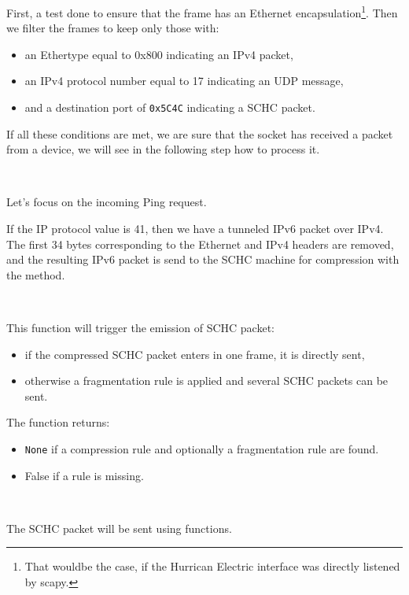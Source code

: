 
First, a test done to ensure that the frame has an Ethernet encapsulation\footnote{That wouldbe the case, if the Hurrican Electric interface was directly listened by scapy.}. Then we filter the frames to keep only those with:
\begin{itemize}
    \item an Ethertype equal to 0x800 indicating an IPv4 packet,
    \item an IPv4 protocol number equal to 17 indicating an UDP message,
    \item and a destination port of \texttt{0x5C4C} indicating a SCHC packet.
\end{itemize}

If all these conditions are met, we are sure that the socket has received a packet from a device, we will see in the following step how to process it.

~

Let's focus on the incoming Ping request.




If the IP protocol value is 41, then we have a tunneled IPv6 packet over IPv4. The first 34 bytes corresponding to the Ethernet and IPv4 headers are removed, and the resulting IPv6 packet is send to the SCHC machine for compression with the  method. 

~~

This function will trigger the emission of SCHC packet: 
\begin{itemize}
    \item if the compressed SCHC packet enters in one frame, it is directly sent,
    \item otherwise a fragmentation rule is applied and several SCHC packets can be sent.
\end{itemize}

The function returns:
\begin{itemize}
    \item \texttt{None} if a compression rule and optionally a fragmentation rule are found.
    \item False if a rule is missing.
\end{itemize}


~~


The SCHC packet will be sent using  functions.

